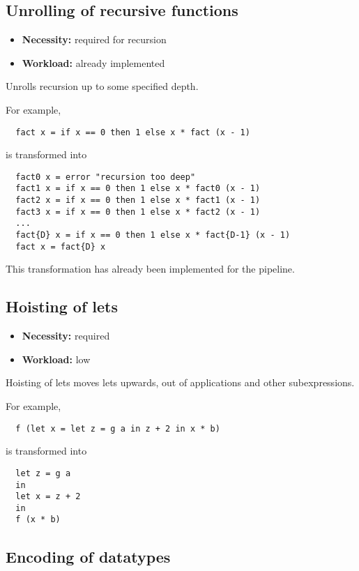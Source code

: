 \documentclass[
    9pt,            %
    techreport,        %
    affiltop,       %
]{art}
\begin{document}
\subsection{Unrolling of recursive functions}

\begin{itemize}
\item {\bf Necessity:} required for recursion
\item {\bf Workload:} already implemented
\end{itemize}

\noindent Unrolls recursion up to some specified depth.

\medskip

\noindent For example,
\begin{verbatim}
  fact x = if x == 0 then 1 else x * fact (x - 1)
\end{verbatim}
is transformed into
\begin{verbatim}
  fact0 x = error "recursion too deep"
  fact1 x = if x == 0 then 1 else x * fact0 (x - 1)
  fact2 x = if x == 0 then 1 else x * fact1 (x - 1)
  fact3 x = if x == 0 then 1 else x * fact2 (x - 1)
  ...
  fact{D} x = if x == 0 then 1 else x * fact{D-1} (x - 1)
  fact x = fact{D} x
\end{verbatim}
This transformation has already been implemented for the \Geb{} pipeline.

\subsection{Hoisting of lets}\label{sec_let_hoisting}

\begin{itemize}
\item {\bf Necessity:} required
\item {\bf Workload:} low
\end{itemize}

\noindent Hoisting of lets moves lets upwards, out of applications and
other subexpressions.

\medskip

\noindent For example,
\begin{verbatim}
  f (let x = let z = g a in z + 2 in x * b)
\end{verbatim}
is transformed into
\begin{verbatim}
  let z = g a
  in
  let x = z + 2
  in
  f (x * b)
\end{verbatim}

\subsection{Encoding of datatypes}
\end{document}
